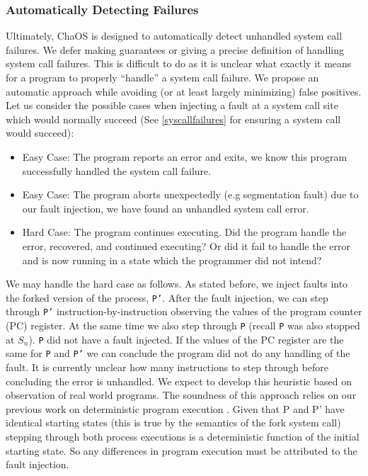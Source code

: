 \subsubsection{Automatically Detecting Failures}
Ultimately, ChaOS is designed to automatically detect unhandled system call failures. We defer making guarantees or giving a precise definition of handling system call failures. This is difficult to do as it is unclear what exactly it means for a program to properly ``handle'' a system call failure. We propose an automatic approach while avoiding (or at least largely minimizing) false positives. Let us consider the possible cases when injecting a fault at a system call site which would normally succeed (See \ref{syscallfailures} for ensuring a system call would succeed):
\begin{itemize}
\item Easy Case: The program reports an error and exits, we know this program successfully handled the system call failure.
\item Easy Case: The program aborts unexpectedly (e.g segmentation fault) due to our fault injection, we have found an unhandled system call error.
\item Hard Case: The program continues executing. Did the program handle the error, recovered, and continued executing? Or did it fail to handle the error and is now running in a state which the programmer did not intend?
\end{itemize}
We may handle the hard case as follows. As stated before, we inject faults into the forked version of the process, \texttt{P'}. After the fault injection, we can step through \texttt{P'} instruction-by-instruction observing the values of the program counter (PC) register. At the same time we also step through \texttt{P} (recall \texttt{P} was also stopped at $S_n$). \texttt{P} did not have a fault injected. If the values of the PC register are the same for \texttt{P} and \texttt{P'} we can conclude the program did not do any handling of the fault. It is currently unclear how many instructions to step through before concluding the error is unhandled. We expect to develop this heuristic based on observation of real world programs.
The soundness of this approach relies on our previous work on deterministic program execution \cite{dettrace}. Given that P and P’ have identical starting states (this is true by the semantics of the fork system call) stepping through both process executions is a deterministic function of the initial starting state. So any differences in program execution must be attributed to the fault injection.

